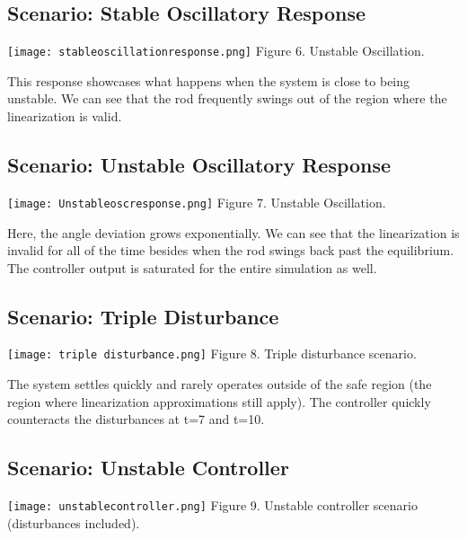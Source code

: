\documentclass{article}
\begin{document}
\subsection{Scenario: Stable Oscillatory Response}

    \begin{center}
        \texttt{[image: stableoscillationresponse.png]}
        Figure 6. Unstable Oscillation. 
    \end{center}
    
    This response showcases what happens when the system is close to being unstable. We can see that the rod frequently swings out of the region where the linearization is valid.

\subsection{Scenario: Unstable Oscillatory Response}

    \begin{center}
        \texttt{[image: Unstableoscresponse.png]}
        Figure 7. Unstable Oscillation. 
    \end{center}
    
    Here, the angle deviation grows exponentially. We can see that the linearization is invalid for all of the time besides when the rod swings back past the equilibrium. The controller output is saturated for the entire simulation as well.
    
\subsection{Scenario: Triple Disturbance}    
    \begin{center}
        \texttt{[image: triple disturbance.png]}
        Figure 8. Triple disturbance scenario.
    \end{center}
    
     The system settles quickly and rarely operates outside of the safe region (the region where linearization approximations still apply). The controller quickly counteracts the disturbances at t=7 and t=10.
    
    
\subsection{Scenario: Unstable Controller}
    \begin{center}
        \texttt{[image: unstablecontroller.png]}
        Figure 9. Unstable controller scenario (disturbances included).
    \end{center}
    
\end{document}
